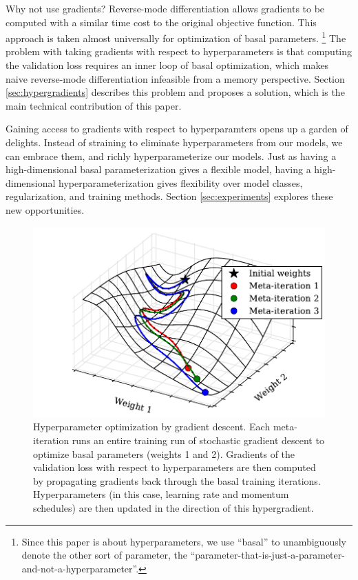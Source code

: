 \documentclass{article}
\newcommand{\primal}{basal}
\begin{document}
Why not use gradients?
Reverse-mode differentiation allows gradients to be computed with a similar time
cost to the original objective function.
This approach is taken almost universally for optimization of \primal{} parameters.%
\footnote{Since this paper is about hyperparameters, we
  use ``\primal{}'' to unambiguously denote the other sort of parameter, the
  ``parameter-that-is-just-a-parameter-and-not-a-hyperparameter''.
}
The problem with taking gradients with respect to hyperparameters is that computing the validation loss requires an inner loop of \primal{} optimization, which makes naive reverse-mode differentiation infeasible from a memory perspective.
Section \ref{sec:hypergradients} describes this problem and proposes a solution, which is the main technical contribution of this paper.

Gaining access to gradients with respect to hyperparamters opens up a garden of
delights. Instead of straining to eliminate hyperparameters from our models, we
can embrace them, and richly hyperparameterize our models.
Just as having a high-dimensional \primal{} parameterization gives a
flexible model, having a high-dimensional hyperparameterization gives
flexibility over model classes, regularization, and training methods.
Section \ref{sec:experiments} explores these new opportunities.

\begin{figure}[t]
\vskip 0.2in
\begin{center}
\includegraphics[width=\columnwidth]{../experiments/Jan_25_Figure_1/2/learning_curves.pdf}
\caption{Hyperparameter optimization by gradient descent.
Each meta-iteration runs an entire training run of stochastic gradient descent to optimize \primal{} parameters (weights 1 and 2).
Gradients of the validation loss with respect to hyperparameters are then computed by propagating gradients back through the \primal{} training iterations.
Hyperparameters (in this case, learning rate and momentum schedules) are then updated in the direction of this hypergradient.}
\label{fig:chaos}
\end{center}
\vskip -0.2in
\end{figure}
\end{document}
